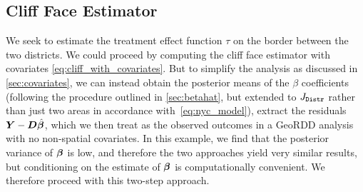 \subsection{Cliff Face Estimator}

We seek to estimate the treatment effect function \(\tau\) on the border between the two districts.
We could proceed by computing the cliff face estimator with covariates \autoref{eq:cliff_with_covariates}.
But to simplify the analysis as discussed in \autoref{sec:covariates}, we can instead obtain the posterior means of the \(\beta\) coefficients (following the procedure outlined in \autoref{sec:betahat}, but extended to \(J_{\mathtt{Distr}}\) rather than just two areas in accordance with~\autoref{eq:nyc_model}), extract the residuals \(\bm{Y}{}-\bm{D} \hat{\bm{\beta}}\), which we then treat as the observed outcomes in a GeoRDD analysis with no non-spatial covariates.
In this example, we find that the posterior variance of \(\bm{\beta}\) is low, and therefore the two approaches yield very similar results, but conditioning on the estimate of \(\bm{\beta}\) is computationally convenient.
We therefore proceed with this two-step approach.


